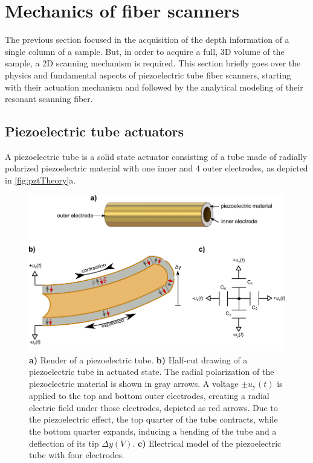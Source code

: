 \section{Mechanics of fiber scanners}

The previous section focused in the acquisition of the depth information of a single column of a sample. But, in order to acquire a full, 3D volume of the sample, a 2D scanning mechanism is required. This section briefly goes over the physics and fundamental aspects of piezoelectric tube fiber scanners, starting with their actuation mechanism and followed by the analytical modeling of their resonant scanning fiber.

\subsection{Piezoelectric tube actuators}
\label{ssec:piezo}
A piezoelectric tube is a solid state actuator consisting of a tube made of radially polarized piezoelectric material with one inner and 4 outer electrodes, as depicted in \autoref{fig:pztTheory}a. 
\begin{figure}[h!]
      \centering
      \includegraphics{figures/20_Theory/Mechanical/pztTheory.pdf}
      \caption{	\textbf{a)} Render of a piezoelectric tube.
      			\textbf{b)} Half-cut drawing of a piezoelectric tube in actuated state. The radial polarization of the piezoelectric material is shown in gray arrows. A voltage $\pm u_\mathrm{y}(t)$ is applied to the top and bottom outer electrodes, creating a radial electric field under those electrodes, depicted as red arrows. Due to the piezoelectric effect, the top quarter of the tube contracts, while the bottom quarter expands, inducing a bending of the tube and a deflection of its tip $\Delta y(V)$.
      			\textbf{c)} Electrical model of the piezoelectric tube with four electrodes.}
      \label{fig:pztTheory}
\end{figure}
